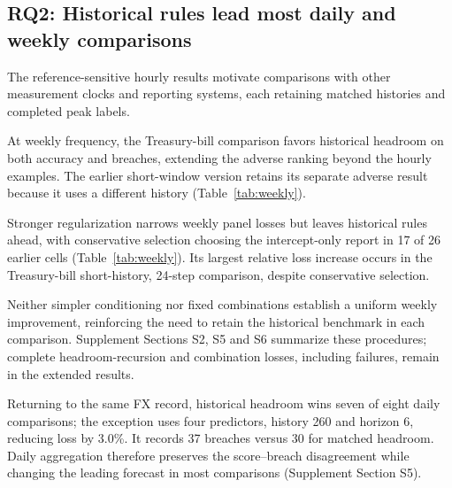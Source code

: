 \documentclass[11pt,a4paper]{article}
\begin{document}
\subsection{RQ2: Historical rules lead most daily and weekly comparisons}

The reference-sensitive hourly results motivate comparisons with other measurement clocks and reporting systems, each retaining matched histories and completed peak labels.

At weekly frequency, the Treasury-bill comparison favors historical headroom on both accuracy and breaches, extending the adverse ranking beyond the hourly examples. The earlier short-window version retains its separate adverse result because it uses a different history (Table~\ref{tab:weekly}).

Stronger regularization narrows weekly panel losses but leaves historical rules ahead, with conservative selection choosing the intercept-only report in 17 of 26 earlier cells (Table~\ref{tab:weekly}). Its largest relative loss increase occurs in the Treasury-bill short-history, 24-step comparison, despite conservative selection.

Neither simpler conditioning nor fixed combinations establish a uniform weekly improvement, reinforcing the need to retain the historical benchmark in each comparison. Supplement Sections S2, S5 and S6 summarize these procedures; complete headroom-recursion and combination losses, including failures, remain in the extended results.

Returning to the same FX record, historical headroom wins seven of eight daily comparisons; the exception uses four predictors, history 260 and horizon 6, reducing loss by 3.0\%. It records 37 breaches versus 30 for matched headroom. Daily aggregation therefore preserves the score--breach disagreement while changing the leading forecast in most comparisons (Supplement Section S5).
\end{document}
